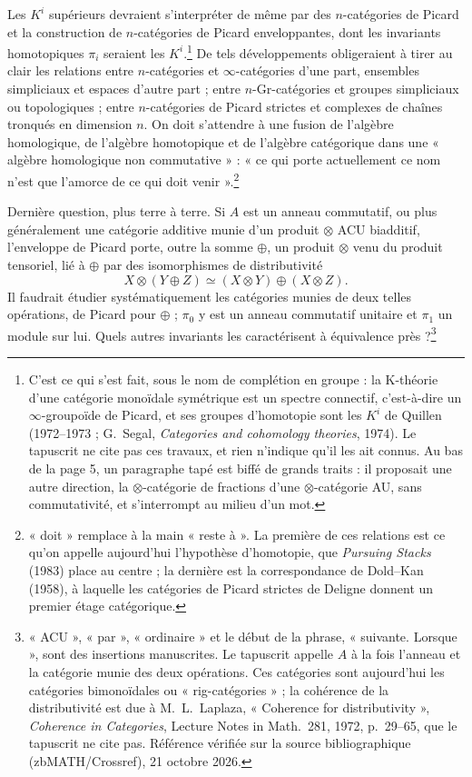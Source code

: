 \documentclass[11pt,a4paper]{article}
\begin{document}
Les $K^i$ supérieurs devraient s'interpréter de même par des
$n$-catégories de Picard et la construction de $n$-catégories de Picard
enveloppantes, dont les invariants homotopiques $\pi_i$ seraient les
$K^i$.\footnote{C'est ce qui s'est fait, sous le nom de complétion en
groupe : la K-théorie d'une catégorie monoïdale symétrique est un spectre
connectif, c'est-à-dire un $\infty$-groupoïde de Picard, et ses groupes
d'homotopie sont les $K^i$ de Quillen (1972--1973 ; G.~Segal, \emph{Categories
and cohomology theories}, 1974). Le tapuscrit ne cite pas ces travaux, et
rien n'indique qu'il les ait connus. Au bas de la page 5, un paragraphe tapé
est biffé de grands traits : il proposait une autre direction, la
$\otimes$-catégorie de fractions d'une $\otimes$-catégorie AU, sans
commutativité, et s'interrompt au milieu d'un mot.} De tels développements
obligeraient à tirer au clair les relations entre $n$-catégories et
$\infty$-catégories d'une part, ensembles simpliciaux et espaces d'autre part ;
entre $n$-Gr-catégories et groupes simpliciaux ou topologiques ; entre
$n$-catégories de Picard strictes et complexes de chaînes tronqués en
dimension $n$. On doit s'attendre à une fusion de l'algèbre homologique, de
l'algèbre homotopique et de l'algèbre catégorique dans une « algèbre
homologique non commutative » : « ce qui porte actuellement ce nom n'est que
l'amorce de ce qui doit venir ».\footnote{« doit » remplace à la main « reste
à ». La première de ces relations est ce qu'on appelle aujourd'hui
l'hypothèse d'homotopie, que \emph{Pursuing Stacks} (1983) place au centre ;
la dernière est la correspondance de Dold--Kan (1958), à laquelle les
catégories de Picard strictes de Deligne donnent un premier étage
catégorique.}

Dernière question, plus terre à terre. Si $A$ est un anneau commutatif, ou
plus généralement une catégorie additive munie d'un produit $\otimes$ ACU
biadditif, l'enveloppe de Picard porte, outre la somme $\oplus$, un produit
$\otimes$ venu du produit tensoriel, lié à $\oplus$ par des isomorphismes de
distributivité
\[ X \otimes (Y \oplus Z) \simeq (X \otimes Y) \oplus (X \otimes Z) . \]
Il faudrait étudier systématiquement les catégories munies de deux telles
opérations, de Picard pour $\oplus$ ; $\pi_0$ y est un anneau commutatif
unitaire et $\pi_1$ un module sur lui. Quels autres invariants les
caractérisent à équivalence près ?\footnote{« ACU », « par », « ordinaire »
et le début de la phrase, « suivante. Lorsque », sont des insertions
manuscrites. Le tapuscrit appelle $A$ à la fois l'anneau et la catégorie
munie des deux opérations. Ces catégories sont aujourd'hui les catégories
bimonoïdales ou « rig-catégories » ; la cohérence de la distributivité est due à M.~L.~Laplaza, « Coherence for distributivity », \emph{Coherence in Categories}, Lecture Notes in Math.\ 281, 1972, p.~29--65, que le tapuscrit ne cite pas. Référence vérifiée sur la source bibliographique (zbMATH/Crossref), 21 octobre 2026.}
\end{document}
